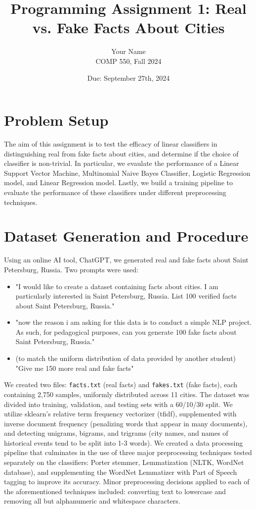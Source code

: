 \documentclass[11pt]{article}
\title{Programming Assignment 1: Real vs. Fake Facts About Cities}
\author{Your Name \\
COMP 550, Fall 2024}
\date{Due: September 27th, 2024}
\begin{document}
\maketitle

\section{Problem Setup}
The aim of this assignment is to test the efficacy of linear classifiers
in distinguishing real from fake facts about cities, and determine if the choice
of classifier is non-trivial. In particular, we evaulate the performance 
of a Linear Support Vector Machine, Multinomial Naive Bayes Classifier, 
Logistic Regression model, and Linear Regression model. Lastly, we build a training pipeline
to evaluate the performance of these classifiers under different preprocessing 
techniques.


\section{Dataset Generation and Procedure}
Using an online AI tool, ChatGPT, we generated real and fake facts about Saint Petersburg, Russia. Two prompts were used:
\begin{itemize}
    \item "I would like to create a dataset containing facts about cities. 
    I am particularly interested in Saint Petersburg, Russia.
    List 100 verified facts about Saint Petersburg, Russia."
    \item "now the reason i am asking for this data is to conduct a simple NLP project. 
    As such, for pedagogical purposes, can you generate 100 fake facts about Saint Petersburg, Russia."
    \item (to match the uniform distribution of data provided by another student) "Give me 150 more real and fake facts"
\end{itemize}
We created two files: \texttt{facts.txt} (real facts) 
and \texttt{fakes.txt} (fake facts), each containing 2,750 samples, 
uniformly distributed across 11 cities. The dataset was divided into 
training, validation, and testing sets
with a 60/10/30 split. We utilize sklearn's relative term frequency
vectorizer (tfidf), supplemented with inverse document frequency 
(penalizing words that appear in many documents), 
and detecting unigrams, bigrams, and trigrams (city names, and names of historical 
events tend to be split into 1-3 words). We created a data processing pipeline
that culminates in the use of three major preprocessing techniques
tested separately on the classifiers: 
Porter stemmer, 
Lemmatization (NLTK, WordNet database), 
and supplementing the WordNet Lemmatizer 
with Part of Speech tagging 
to improve its accuracy.
Minor preprocessing decisions applied 
to each of the aforementioned techniques
included: converting text to lowercase and
removing all but alphanumeric and whitespace characters.
\end{document}
